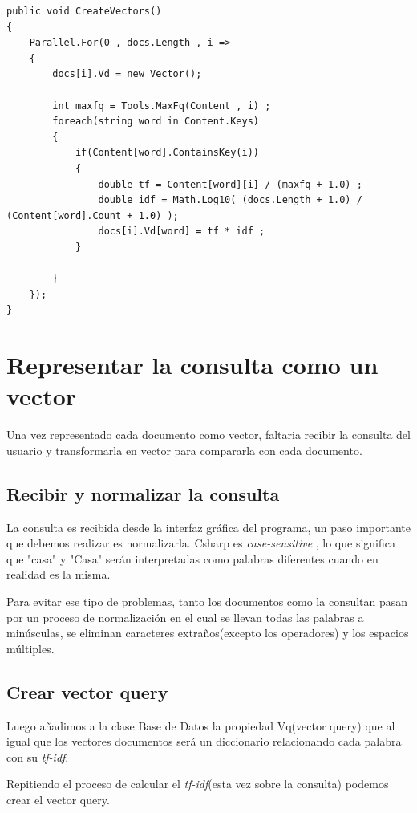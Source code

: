 \documentclass{article}
\begin{document}
\newpage

\begin{lstlisting}
public void CreateVectors()
{
    Parallel.For(0 , docs.Length , i =>
    {
        docs[i].Vd = new Vector();

        int maxfq = Tools.MaxFq(Content , i) ; 
        foreach(string word in Content.Keys)
        {
            if(Content[word].ContainsKey(i))
            {
                double tf = Content[word][i] / (maxfq + 1.0) ;
                double idf = Math.Log10( (docs.Length + 1.0) / (Content[word].Count + 1.0) );
                docs[i].Vd[word] = tf * idf ;                
            }
                
        }
    });
}
\end{lstlisting}

\section{Representar la consulta como un vector}
Una vez representado cada documento como vector, faltaria recibir la consulta del usuario y transformarla en vector para
compararla con cada documento.


\subsection{Recibir y normalizar la consulta}
La consulta es recibida desde la interfaz gráfica del programa, un paso importante que debemos realizar es normalizarla.
Csharp es \textit{case-sensitive} , lo que significa que "casa" y "Casa" serán interpretadas como palabras diferentes cuando
en realidad es la misma.

Para evitar ese tipo de problemas, tanto los documentos como la consultan pasan por un proceso de normalización en el cual
se llevan todas las palabras a minúsculas, se eliminan caracteres extraños(excepto los operadores) y los espacios múltiples.

\subsection{Crear vector query}
Luego añadimos a la clase Base de Datos la propiedad Vq(vector query) que al igual que los vectores documentos será un diccionario
relacionando cada palabra con su \textit{tf-idf}.

Repitiendo el proceso de calcular el \textit{tf-idf}(esta vez sobre la consulta) podemos crear el vector query.
\end{document}
